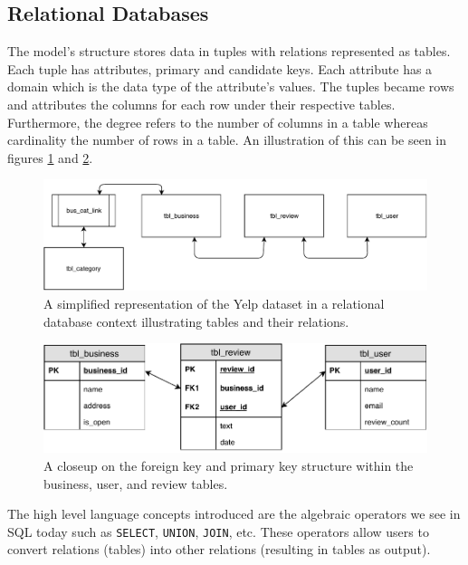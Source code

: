 \subsection{Relational Databases}

The  model's structure stores data in tuples with relations represented as tables. Each tuple has attributes, primary and candidate keys. Each attribute has a domain which is the data type of the attribute's values. The tuples became rows and attributes the columns for each row under their respective tables. Furthermore, the degree refers to the number of columns in a table whereas cardinality the number of rows in a table. An illustration of this can be seen in figures \ref{fig:relationalDatabase} and \ref{fig:foreignKey}.

\begin{figure}[h]
    \centering
    \includegraphics[width=15cm]{img/3_litReviewFigures/relationalDatabase.pdf}
    \caption{A simplified representation of the Yelp dataset in a relational database context illustrating tables and their relations.}
    \label{fig:relationalDatabase}
\end{figure}

\begin{figure}[h]
    \centering
    \includegraphics[width=13cm]{img/3_litReviewFigures/foreignKey.pdf}
    \caption{A closeup on the foreign key and primary key structure within the business, user, and review tables.}
    \label{fig:foreignKey}
\end{figure}

The high level language concepts introduced are the algebraic operators we see in SQL today such as \verb|SELECT|, \verb|UNION|, \verb|JOIN|, etc. These operators allow users to convert relations (tables) into other relations (resulting in tables as output).

